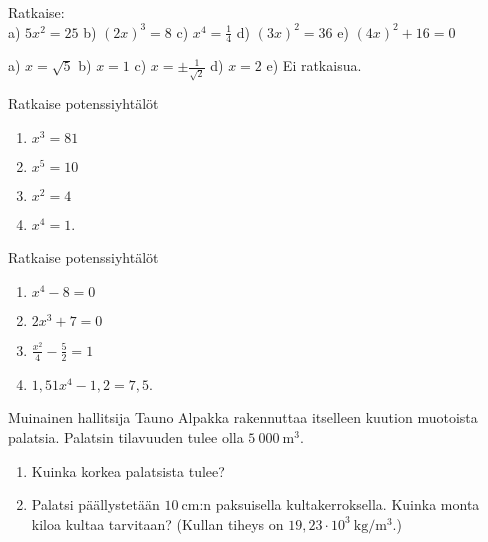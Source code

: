 \begin{tehtava}
Ratkaise: \\
a) $ 5x^2 = 25 $ \qquad
b) $ (2x)^3 = 8 $ \qquad
c) $ x^4 = \frac{1}{4} $ \qquad
d) $ (3x)^2 = 36 $ \qquad
e) $ (4x)^2 + 16 = 0 $ 
\begin{vastaus}
a) $ x = \sqrt{5} $ \qquad
b) $ x = 1 $ \qquad
c) $ x = \pm\frac{1}{\sqrt{2}} $ \qquad
d) $ x = 2 $ \qquad
e) Ei ratkaisua. 
\end{vastaus}
\end{tehtava}

\begin{tehtava}
Ratkaise potenssiyhtälöt
\begin{enumerate}
\item $x^3 = 81$
\item $x^5 = 10$
\item $x^2 = 4$
\item $x^4 = 1$.
\end{enumerate}
\end{tehtava}

\begin{tehtava}
Ratkaise potenssiyhtälöt
\begin{enumerate}
\item $x^4 - 8 = 0$
\item $2x^3 + 7 = 0$
\item $\frac{x^2}{4} - \frac{5}{2} = 1$
\item $1,51 x^4 - 1,2 = 7,5$.
\end{enumerate}
\end{tehtava}

\begin{tehtava}
Muinainen hallitsija Tauno Alpakka rakennuttaa itselleen kuution muotoista palatsia.  Palatsin tilavuuden tulee olla $5~000~\mathrm{m}^3$. 
\begin{enumerate}
\item Kuinka korkea palatsista tulee?
\item Palatsi päällystetään $10~\mathrm{cm}$:n paksuisella kultakerroksella.  Kuinka monta kiloa kultaa tarvitaan? (Kullan tiheys on $19,23 \cdot 10^3~\mathrm{ kg}/\mathrm{m}^3$.)
\end{enumerate}
\end{tehtava}

